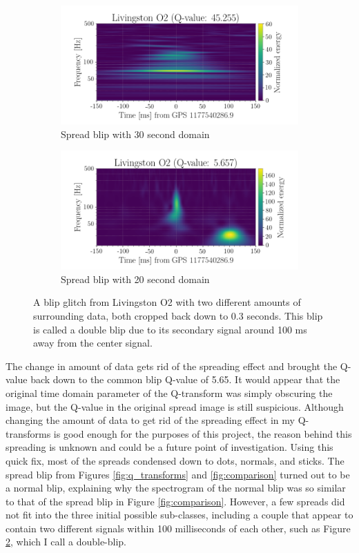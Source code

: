 \documentclass[a4paper]{article}
\begin{document}
\begin{figure}[h!]
	\centering
	\begin{subfigure}{.49\textwidth}
		\centering
		\includegraphics[width=1\linewidth]{spread_ex_30s}
		\caption{Spread blip with 30 second domain}
		\label{fig:spread_30}
	\end{subfigure}
	\begin{subfigure}{.49\textwidth}
		\centering
		\includegraphics[width=1\linewidth]{spread_ex_20s}
		\caption{Spread blip with 20 second domain}
		\label{fig:spread_20}
	\end{subfigure}
	\caption{A blip glitch from Livingston O2 with two different amounts of surrounding data, both cropped back down to 0.3 seconds. This blip is called a double blip due to its secondary signal around 100 ms away from the center signal.}
	\label{fig:spread_ex}
\end{figure}

The change in amount of data gets rid of the spreading effect and brought the Q-value back down to the common blip Q-value of 5.65. It would appear that the original time domain parameter of the Q-transform was simply obscuring the image, but the Q-value in the original spread image is still suspicious. Although changing the amount of data to get rid of the spreading effect in my Q-transforms is good enough for the purposes of this project, the reason behind this spreading is unknown and could be a future point of investigation. Using this quick fix, most of the spreads condensed down to dots, normals, and sticks. The spread blip from Figures \ref{fig:q_transforms} and \ref{fig:comparison} turned out to be a normal blip, explaining why the spectrogram of the normal blip was so similar to that of the spread blip in Figure \ref{fig:comparison}. However, a few spreads did not fit into the three initial possible sub-classes, including a couple that appear to contain two different signals within 100 milliseconds of each other, such as Figure \ref{fig:spread_20}, which I call a double-blip. 
\end{document}
